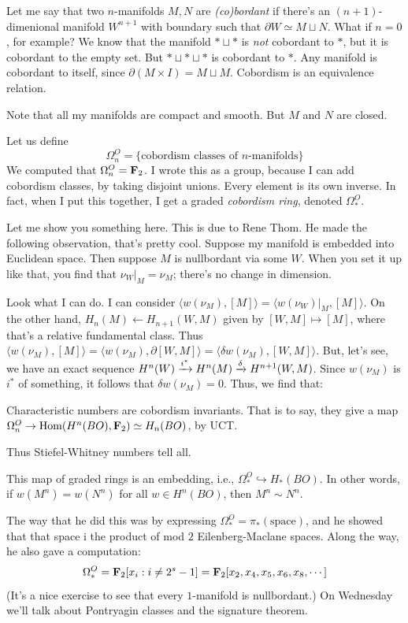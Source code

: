 Let me say that two $n$-manifolds $M, N$ are \emph{(co)bordant} if there's an $(n+1)$-dimenional manifold $W^{n+1}$ with boundary such that $\partial W\simeq M\sqcup N$.
What if $n=0$, for example?
We know that the manifold $\ast\sqcup \ast$ is \emph{not} cobordant to $\ast$, but it is cobordant to the empty set.
But $\ast\sqcup\ast\sqcup\ast$ is cobordant to $\ast$.
Any manifold is cobordant to itself, since $\partial(M\times I) = M\sqcup M$.
Cobordism is an equivalence relation.

Note that all my manifolds are compact and smooth.
But $M$ and $N$ are closed.

Let us define
$$
\Omega^O_n = \{\text{cobordism classes of $n$-manifolds}\}
$$
We computed that $\Omega^O_n = \mathbf F_2$.
I wrote this as a group, because I can add cobordism classes, by taking disjoint unions.
Every element is its own inverse.
In fact, when I put this together, I get a graded \emph{cobordism ring}, denoted $\Omega^O_\ast$.

Let me show you something here.
This is due to Rene Thom.
He made the following observation, that's pretty cool.
Suppose my manifold is embedded into Euclidean space.
Then suppose $M$ is nullbordant via some $W$.
When you set it up like that, you find that $\nu_W|_{M} = \nu_M$; there's no change in dimension.

Look what I can do.
I can consider $\langle w(\nu_M),[M]\rangle = \langle w(\nu_W)|_{M},[M]\rangle$.
On the other hand, $H_n(M) \leftarrow H_{n+1}(W,M)$ given by $[W,M]\mapsto[M]$, where that's a relative fundamental class.
Thus $\langle w(\nu_M),[M]\rangle = \langle w(\nu_M),\partial[W,M]\rangle = \langle \delta w(\nu_M),[W,M]\rangle$.
But, let's see, we have an exact sequence $H^n(W)\xrightarrow{{i^\ast}} H^n(M) \xrightarrow{{\delta}} H^{n+1}(W,M)$.
Since $w(\nu_M)$ is $i^\ast$ of something, it follows that $\delta w(\nu_M) = 0$.
Thus, we find that:
\begin{prop}
    Characteristic numbers are cobordism invariants.
    That is to say, they give a map $\Omega^O_n \to \operatorname{Hom}(H^n(BO),\mathbf F_2)\simeq H_n(BO)$, by UCT.
\end{prop}
Thus Stiefel-Whitney numbers tell all.
\begin{theorem}[Thom, 1954]
    This map of graded rings is an embedding, i.e., $\Omega^O_\ast \hookrightarrow H_\ast(BO)$.
    In other words, if $w(M^n) = w(N^n)$ for all $w\in H^n(BO)$, then $M^n \sim N^n$.
\end{theorem}
The way that he did this was by expressing $\Omega^O_\ast = \pi_\ast(\text{space})$, and he showed that that space i the product of mod $2$ Eilenberg-Maclane spaces.
Along the way, he also gave a computation:
$$
\Omega^O_\ast = \mathbf F_2[x_i:i\neq 2^s-1] = \mathbf F_2[x_2,x_4,x_5,x_6,x_8,\cdots]
$$
(It's a nice exercise to see that every $1$-manifold is nullbordant.)
On Wednesday we'll talk about Pontryagin classes and the signature theorem.
